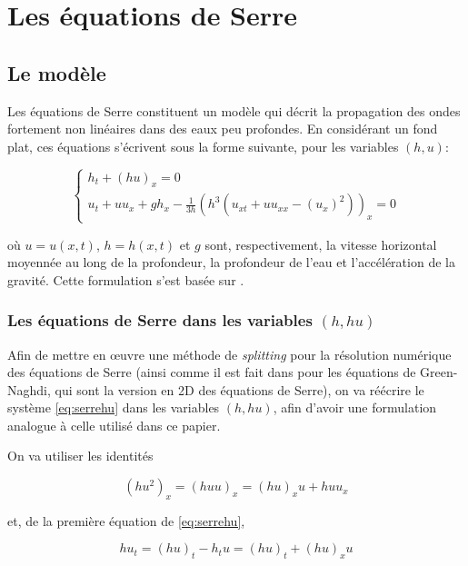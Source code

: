 \section{Les équations de Serre}
\label{sec:Serre}

\subsection{Le modèle}

\indent Les équations de Serre constituent un modèle qui décrit la propagation des ondes fortement non linéaires dans des eaux peu profondes. En considérant un fond plat, ces équations s'écrivent sous la forme suivante, pour les variables $(h,u)$:

\begin{equation}
\label{eq:serrehu}
\begin{cases}
h_t + (hu)_x = 0 \\
u_t + uu_x + gh_x - \frac{1}{3h}\left(h^3 \left( u_{xt} + uu_{xx} - (u_x)^2  \right) \right)_x = 0
\end{cases}
\end{equation}

\noindent où $u = u(x,t)$, $h = h(x,t)$ et $g$ sont, respectivement, la vitesse horizontal moyennée au long de la profondeur, la profondeur de l'eau et l'accélération de la gravité. Cette formulation s'est basée sur \cite{CarterCienfuegos2011}.

\subsubsection{Les équations de Serre dans les variables $(h,hu)$}

\indent Afin de mettre en œuvre une méthode de \emph{splitting} pour la résolution numérique des équations de Serre (ainsi comme il est fait dans \cite{Bonneton2011} pour les équations de Green-Naghdi, qui sont la version en 2D des équations de Serre), on va réécrire le système \eqref{eq:serrehu} dans les variables $(h,hu)$, afin d'avoir une formulation analogue à celle utilisé dans ce papier.

\indent On va utiliser les identités

\begin{equation*}
	(hu^2)_x = (huu)_x = (hu)_xu + huu_x
\end{equation*}

\noindent et, de la première équation de \eqref{eq:serrehu},

\begin{equation*}
	hu_t = (hu)_t - h_tu = (hu)_t +  (hu)_xu
\end{equation*}

